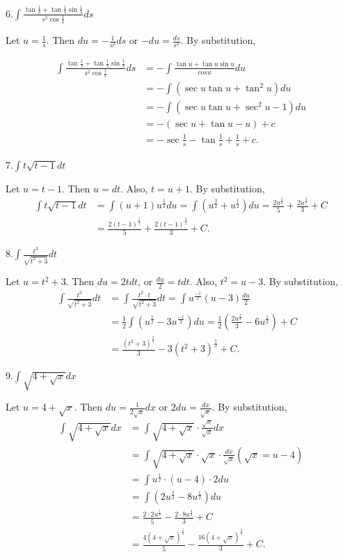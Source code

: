 \documentclass[
  letterpaper,
  DIV=11,
  numbers=noendperiod]{scrartcl}
\theoremstyle{plain}
\theoremstyle{remark}
\begin{document}
6.\(\int \frac{\tan\frac{1}{s}+\tan\frac{1}{s}\sin\frac{1}{s}}{s^2\cos\frac{1}{s}}ds\)

Let \(u=\frac{1}{s}\). Then \(du=-\frac{1}{s^2}ds\) or
\(-du=\frac{ds}{s^2}\). By substitution,

\[
\begin{aligned}
\int\frac{\tan\frac{1}{s}+\tan\frac{1}{s}\sin\frac{1}{s}}{s^2 \cos\frac{1}{s}}ds &=-\int\frac{\tan u+\tan u\sin u}{cosu}du\\&=-\int(\sec u\tan u+\tan^2 u)du\\&=-\int(\sec u\tan u+\sec^2 u-1)du\\&=-(\sec u+\tan u-u)+c\\&=-\sec\frac{1}{s}-\tan\frac{1}{s}+\frac{1}{s}+c.
\end{aligned}
\]

7.\(\int t\sqrt {t-1} dt\)

Let \(u=t-1\). Then \(u=dt\). Also, \(t=u+1\). By substitution,
\[ \begin{aligned}
\int t\sqrt{t-1} dt &=\int \left(u+1\right)u^\frac{1}{2}du =\int \left( u^\frac{3}{2}+u^\frac{1}{2} \right)du =\frac{2u^\frac{5}{2}}{5}+\frac{2u^\frac{3}{2}}{3}+C\\&=\frac{2\left(t-1\right)^\frac{5}{2}}{5}+\frac{2\left(t-1\right)^\frac{3}{2}}{3}+C.
\end{aligned}
\]

8.\(\int \frac{t^3}{\sqrt{t^2+3}}dt\)

Let \(u=t^2+3\). Then \(du=2tdt\), or \(\frac{du}{2}=tdt\). Also,
\(t^2=u-3\). By substitution, \[
\begin{aligned}
\int \frac{t^3}{\sqrt{t^2+3}}dt &= \int \frac{t^2\cdot{t}}{\sqrt {t^2+3}}dt=\int u^\frac{-1}{2}(u-3)\frac{du}{2}&\\&=\frac{1}{2}\int \left(u^\frac{1}{2}-3u^\frac{-1}{2}\right)du =\frac{1}{2} \left(\frac{2u^\frac{3}{2}}{3}-6u^\frac{1}{2}\right)+C \\& =\frac{\left(t^2+3\right)^\frac{3}{2}}{3}-3\left(t^2+3\right)^\frac{1}{2}+C.
\end{aligned}
\]

9.\(\int \sqrt{4+\sqrt x}dx\)

Let \(u=4+\sqrt x\). Then \(du=\frac{1}{2\sqrt x}dx\) or
\(2du=\frac{dx}{\sqrt x}\). By substitution, \[
\begin{aligned}
\int \sqrt{4+\sqrt x}dx&=\int \sqrt{4+\sqrt x} \cdot\frac{\sqrt x}{\sqrt x}dx\\&=\int \sqrt{4+\sqrt x} \cdot \sqrt x\cdot \frac{dx}{\sqrt x} (\sqrt x=u-4)\\&=\int u^\frac{1}{2}\cdot (u-4)\cdot 2du\\&=\int(2u^\frac{3}{2}-8u^\frac{1}{2}) du\\&=\frac{2\cdot2u^\frac{5}{2}}5-\frac{2\cdot 8u^\frac{3}{2}}{3}+C\\&=\frac{4\left (4+\sqrt x\right)^\frac{5}{2}}{5}-\frac{16\left(4+\sqrt x\right)^\frac{3}{2}}{3}+C.
\end{aligned}
\]
\end{document}
